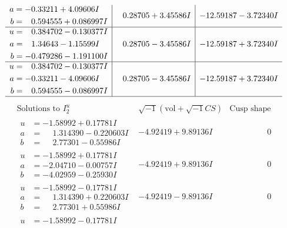 \documentclass[1p]{elsarticle_modified}
\theoremstyle{definition}
\newcommand{\I}{\sqrt{-1}}
\begin{document}
$$\begin{array}{c|c|c}
\begin{aligned}
a &= -0.33211 + 4.09606 I \\
b &= \phantom{-}0.594555 + 0.086997 I\end{aligned}
 & \phantom{-}0.28705 + 3.45586 I & -12.59187 - 3.72340 I \\ \hline\begin{aligned}
u &= \phantom{-}0.384702 - 0.130377 I \\
a &= \phantom{-}1.34643 - 1.15599 I \\
b &= -0.479286 - 1.191100 I\end{aligned}
 & \phantom{-}0.28705 - 3.45586 I & -12.59187 + 3.72340 I \\ \hline\begin{aligned}
u &= \phantom{-}0.384702 - 0.130377 I \\
a &= -0.33211 - 4.09606 I \\
b &= \phantom{-}0.594555 - 0.086997 I\end{aligned}
 & \phantom{-}0.28705 - 3.45586 I & -12.59187 + 3.72340 I\\
 \hline 
 \end{array}$$\newpage$$\begin{array}{c|c|c}  
\text{Solutions to }I^u_{2}& \I (\text{vol} + \sqrt{-1}CS) & \text{Cusp shape}\\
 \hline 
\begin{aligned}
u &= -1.58992 + 0.17781 I \\
a &= \phantom{-}1.314390 - 0.220603 I \\
b &= \phantom{-}2.77301 - 0.55986 I\end{aligned}
 & -4.92419 + 9.89136 I & \phantom{-0.000000 } 0 \\ \hline\begin{aligned}
u &= -1.58992 + 0.17781 I \\
a &= -2.04710 - 0.00757 I \\
b &= -4.02959 - 0.25930 I\end{aligned}
 & -4.92419 + 9.89136 I & \phantom{-0.000000 } 0 \\ \hline\begin{aligned}
u &= -1.58992 - 0.17781 I \\
a &= \phantom{-}1.314390 + 0.220603 I \\
b &= \phantom{-}2.77301 + 0.55986 I\end{aligned}
 & -4.92419 - 9.89136 I & \phantom{-0.000000 } 0 \\ \hline\begin{aligned}
u &= -1.58992 - 0.17781 I \\

\end{aligned}
\end{array}$$
\end{document}
